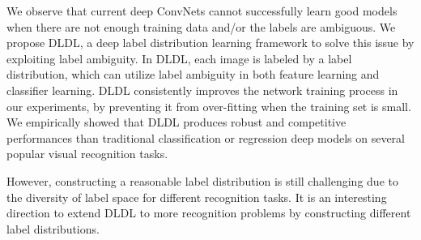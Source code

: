 \documentclass[journal]{IEEEtran}
\begin{document}
We observe that current deep ConvNets cannot successfully learn good models when there are not enough training data and/or the labels are ambiguous. We propose DLDL, a deep label distribution learning framework to solve this issue by exploiting label ambiguity. In DLDL, each image is labeled by a label distribution, which can utilize label ambiguity in both feature learning and classifier learning. DLDL consistently improves the network training process in our experiments, by preventing it from over-fitting when the training set is small. We empirically showed that DLDL produces robust and competitive performances than traditional classification or regression deep models on several popular visual recognition tasks.

However, constructing a reasonable label distribution is still challenging due to the diversity of label space for different recognition tasks. It is an interesting direction to extend DLDL to more recognition problems by constructing different label distributions.
\end{document}
